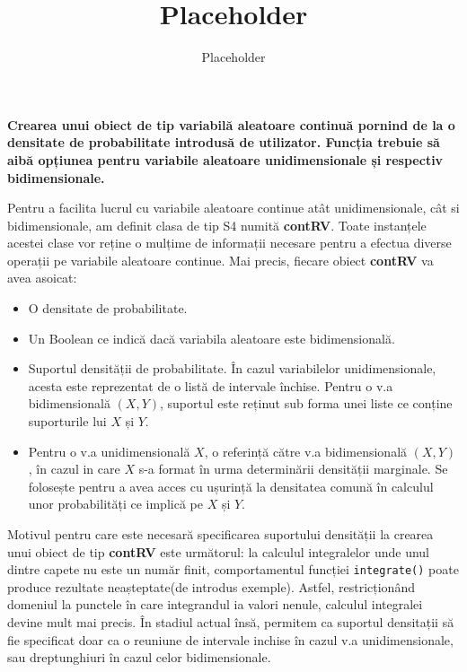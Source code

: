 \documentclass[12pt]{article}
\title{Placeholder}
\author{Placeholder}
\begin{document}
	\textbf{Crearea unui obiect de tip variabilă aleatoare continuă pornind de la o densitate de
		probabilitate introdusă de utilizator. Funcția trebuie să aibă opțiunea pentru variabile
		aleatoare unidimensionale și respectiv bidimensionale.}\vspace{5mm}
	
	Pentru a facilita lucrul cu variabile aleatoare continue atât unidimensionale, cât si bidimensionale, am definit clasa de tip S4 numită \textbf{contRV}. Toate instanțele acestei clase vor reține o mulțime de informații necesare pentru a efectua diverse operații pe variabile aleatoare continue. Mai precis, fiecare obiect \textbf{contRV} va avea asoicat:
	\begin{itemize}
		\item O densitate de probabilitate.
		\item Un Boolean ce indică dacă variabila aleatoare este bidimensională.
		\item Suportul densității de probabilitate. În cazul variabilelor unidimensionale, acesta este reprezentat de o listă de intervale închise. Pentru o v.a bidimensională $(X, Y)$, suportul este reținut sub forma unei liste ce conține suporturile lui $X$ și $Y$.
		\item Pentru o v.a unidimensională $X$, o referință către v.a bidimensională $(X, Y)$, în cazul in care $X$ s-a format în urma determinării densității marginale. Se folosește pentru a avea acces cu ușurință la densitatea comună în calculul unor probabilități ce implică pe $X$ și $Y$.
	\end{itemize}\vspace*{1\baselineskip} \par
	Motivul pentru care este necesară specificarea suportului densității la crearea unui obiect de tip \textbf{contRV} este următorul: la calculul integralelor unde unul dintre capete nu este un număr finit, comportamentul funcției \lstinline|integrate()| poate produce rezultate neașteptate(de introdus exemple). Astfel, restricționând domeniul la punctele în care integrandul ia valori nenule, calculul integralei devine mult mai precis.
	În stadiul actual însă, permitem ca suportul densitații să fie specificat doar ca o reuniune de intervale inchise în cazul v.a unidimensionale, sau dreptunghiuri în cazul celor bidimensionale.\vspace*{1\baselineskip}\par
	
\end{document}
